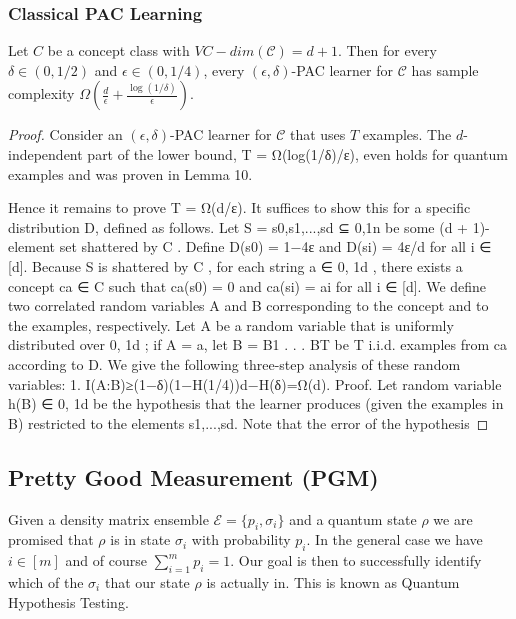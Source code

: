 \documentclass[main.tex]{subfiles}
\begin{document}
{\subsubsection{Classical PAC Learning}

\begin{theorem}
Let $C$ be a concept class with $VC-dim(\mathcal{C}) = d + 1$. Then for every $\delta \in (0,1/2)$ and $\epsilon \in (0,1/4)$, every $(\epsilon,\delta)$-PAC learner for $\mathcal{C}$ has sample complexity $\Omega(\frac{d}{\epsilon} + \frac{\log(1/\delta)}{\epsilon})$.
\end{theorem}

\begin{proof} 
Consider an $(\epsilon,\delta)$-PAC learner for $\mathcal{C}$ that uses $T$ examples. The $d$-independent part of the lower bound, T = Ω(log(1/δ)/ε), even holds for quantum examples and was proven in Lemma 10. 

Hence it remains to prove T = Ω(d/ε). It suffices to show this for a specific distribution D, defined as follows. Let S = {s0,s1,...,sd} ⊆ {0,1}n be some (d + 1)-element set shattered by C . Define D(s0) = 1−4ε and D(si) = 4ε/d for all i ∈ [d].
Because S is shattered by C , for each string a ∈ {0, 1}d , there exists a concept ca ∈ C such that ca(s0) = 0 and ca(si) = ai for all i ∈ [d]. We define two correlated random variables A and B corresponding to the concept and to the examples, respectively. Let A be a random variable that is uniformly distributed over {0, 1}d ; if A = a, let B = B1 . . . BT be T i.i.d. examples from ca according to D. We give the following three-step analysis of these random variables:
1. I(A:B)≥(1−δ)(1−H(1/4))d−H(δ)=Ω(d).
Proof. Let random variable h(B) ∈ {0, 1}d be the hypothesis that the learner produces (given
the examples in B) restricted to the elements s1,...,sd. Note that the error of the hypothesis
\end{proof}

\begin{subappendices}
\subsection{Pretty Good Measurement (PGM)}
\label{app:pgm}

Given a density matrix ensemble $\mathcal{E} = \{p_i, \sigma_i\}$ and a quantum state $\rho$ we are promised that $\rho$ is in state $\sigma_i$ with probability $p_i$. In the general case we have $i \in [m]$ and of course $\sum_{i=1}^m p_i = 1$. Our goal is then to successfully identify which of the $\sigma_i$ that our state $\rho$ is actually in. This is known as Quantum Hypothesis Testing. 


\end{subappendices}}
\end{document}
